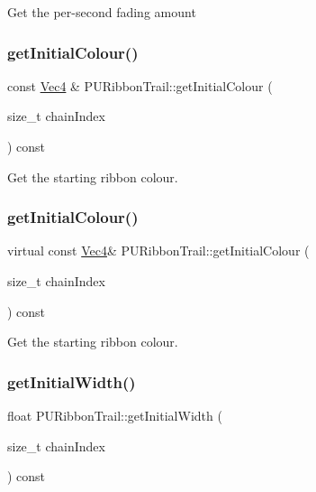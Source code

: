 Get the per-\/second fading amount \mbox{\label{classPURibbonTrail_ae68d1591603536035c6c31736c298356}} 
\subsubsection{\texorpdfstring{get\+Initial\+Colour()}{getInitialColour()}\hspace{0.1cm}{\footnotesize\ttfamily [1/2]}}
{\footnotesize\ttfamily const \hyperlink{classVec4}{Vec4} \& P\+U\+Ribbon\+Trail\+::get\+Initial\+Colour (\begin{DoxyParamCaption}\item[{size\+\_\+t}]{chain\+Index }\end{DoxyParamCaption}) const\hspace{0.3cm}{\ttfamily [virtual]}}

Get the starting ribbon colour. \mbox{\label{classPURibbonTrail_a219cb94e438b1ee2957d78eb2c8695c4}} 
\subsubsection{\texorpdfstring{get\+Initial\+Colour()}{getInitialColour()}\hspace{0.1cm}{\footnotesize\ttfamily [2/2]}}
{\footnotesize\ttfamily virtual const \hyperlink{classVec4}{Vec4}\& P\+U\+Ribbon\+Trail\+::get\+Initial\+Colour (\begin{DoxyParamCaption}\item[{size\+\_\+t}]{chain\+Index }\end{DoxyParamCaption}) const\hspace{0.3cm}{\ttfamily [virtual]}}

Get the starting ribbon colour. \mbox{\label{classPURibbonTrail_aef05b972efc8314ac9474f947b4c2295}} 
\subsubsection{\texorpdfstring{get\+Initial\+Width()}{getInitialWidth()}\hspace{0.1cm}{\footnotesize\ttfamily [1/2]}}
{\footnotesize\ttfamily float P\+U\+Ribbon\+Trail\+::get\+Initial\+Width (\begin{DoxyParamCaption}\item[{size\+\_\+t}]{chain\+Index }\end{DoxyParamCaption}) const\hspace{0.3cm}{\ttfamily [virtual]}}

